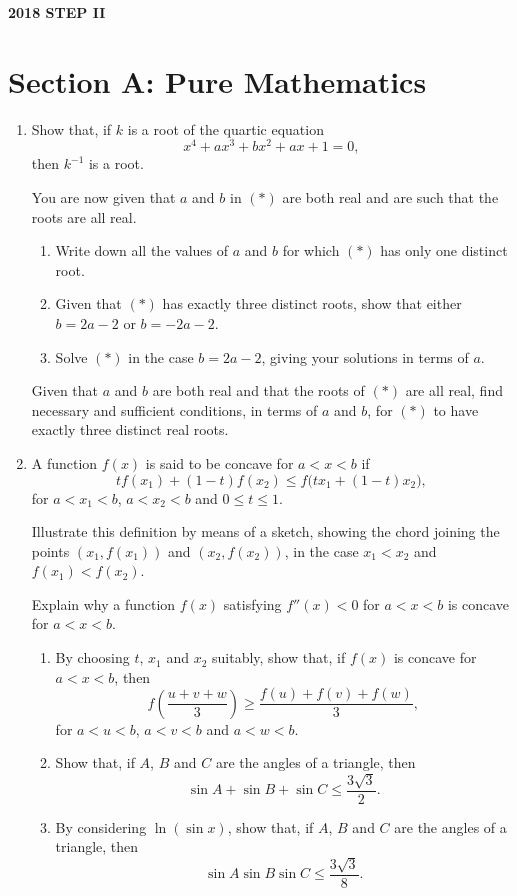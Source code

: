\documentclass[12pt]{article}
\begin{document}
\begin{center}
{\Large \textbf{2018 STEP II}}\\[0.5em]
\end{center}

\section*{Section A: Pure Mathematics}

\begin{enumerate}
\item Show that, if $k$ is a root of the quartic equation
\[
x^4+ax^3+bx^2+ax+1=0, \tag{*}
\]
then $k^{-1}$ is a root.

You are now given that $a$ and $b$ in $(*)$ are both real and are such that the roots are all real.
\begin{enumerate}
\item Write down all the values of $a$ and $b$ for which $(*)$ has only one distinct root.
\item Given that $(*)$ has exactly three distinct roots, show that either $b=2a-2$ or $b=-2a-2$.
\item Solve $(*)$ in the case $b=2a-2$, giving your solutions in terms of $a$.
\end{enumerate}
Given that $a$ and $b$ are both real and that the roots of $(*)$ are all real, find necessary and sufficient conditions, in terms of $a$ and $b$, for $(*)$ to have exactly three distinct real roots.

\item A function $f(x)$ is said to be concave for $a<x<b$ if
\[
t f(x_1)+(1-t)f(x_2)\leq f\bigl(tx_1+(1-t)x_2\bigr),
\]
for $a<x_1<b$, $a<x_2<b$ and $0\leq t\leq 1$.

Illustrate this definition by means of a sketch, showing the chord joining the points $(x_1,f(x_1))$ and $(x_2,f(x_2))$, in the case $x_1<x_2$ and $f(x_1)<f(x_2)$.

Explain why a function $f(x)$ satisfying $f''(x)<0$ for $a<x<b$ is concave for $a<x<b$.
\begin{enumerate}
\item By choosing $t$, $x_1$ and $x_2$ suitably, show that, if $f(x)$ is concave for $a<x<b$, then
\[
f\left(\frac{u+v+w}{3}\right)\geq \frac{f(u)+f(v)+f(w)}{3},
\]
for $a<u<b$, $a<v<b$ and $a<w<b$.
\item Show that, if $A$, $B$ and $C$ are the angles of a triangle, then
\[
\sin A+\sin B+\sin C\leq \frac{3\sqrt{3}}{2}.
\]
\item By considering $\ln(\sin x)$, show that, if $A$, $B$ and $C$ are the angles of a triangle, then
\[
\sin A\sin B\sin C\leq \frac{3\sqrt{3}}{8}.
\]
\end{enumerate}


\end{enumerate}
\end{document}
